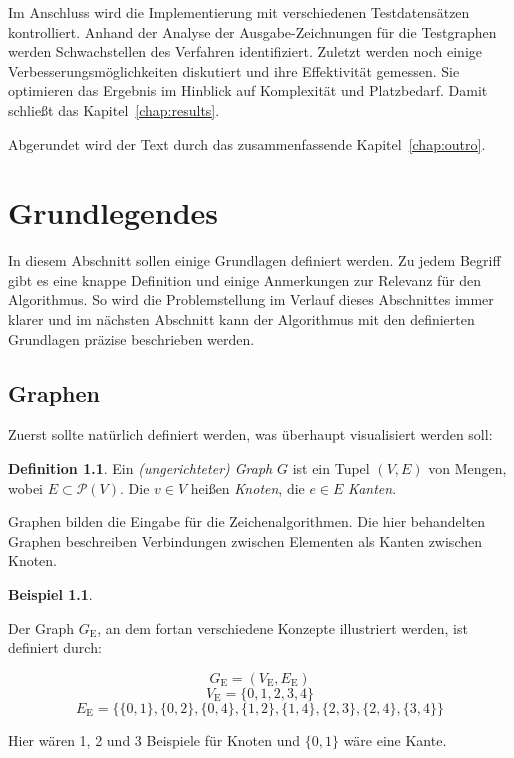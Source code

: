 \documentclass[a4paper]{scrreprt}
\theoremstyle{definition}
\newtheorem{definition}[satz]{Definition}
\newtheorem{example}[satz]{Beispiel}
\begin{document}
Im Anschluss wird die Implementierung mit verschiedenen Testdatensätzen kontrolliert. Anhand der Analyse der Ausgabe-Zeichnungen für die Testgraphen werden Schwachstellen des Verfahren identifiziert. Zuletzt werden noch einige Verbesserungsmöglichkeiten diskutiert und ihre Effektivität gemessen. Sie optimieren das Ergebnis im Hinblick auf Komplexität und Platzbedarf. Damit schließt das Kapitel~\ref{chap:results}.

Abgerundet wird der Text durch das zusammenfassende Kapitel~\ref{chap:outro}.





\chapter{Grundlegendes}
\label{chap:basics}

In diesem Abschnitt sollen einige Grundlagen definiert werden. Zu jedem Begriff gibt es eine knappe Definition und einige Anmerkungen zur Relevanz für den Algorithmus. So wird die Problemstellung im Verlauf dieses Abschnittes immer klarer und im nächsten Abschnitt kann der Algorithmus mit den definierten Grundlagen präzise beschrieben werden.

\section{Graphen}

Zuerst sollte natürlich definiert werden, was überhaupt visualisiert werden soll:

\begin{definition}
  Ein \emph{(ungerichteter) Graph} $G$ ist ein Tupel $(V, E)$ von Mengen, wobei $E \subset \mathcal{P}(V)$.
  Die $v \in V$ heißen \emph{Knoten}, die $e \in E$ \emph{Kanten}.
\end{definition}

Graphen bilden die Eingabe für die Zeichenalgorithmen. Die hier behandelten Graphen beschreiben Verbindungen zwischen Elementen als Kanten zwischen Knoten. 

\begin{example}
  \label{ex:graph}

Der Graph $G_\text{E}$, an dem fortan verschiedene Konzepte illustriert werden, ist definiert durch:

\[G_\text{E} = (V_\text{E}, E_\text{E})\]
\[V_\text{E} = \{0, 1, 2, 3, 4\}\]
\[E_\text{E} = \{\{0, 1\}, \{0, 2\}, \{0, 4\}, \{1, 2\}, \{1, 4\}, \{2, 3\}, \{2, 4\}, \{3, 4\}\}\]

Hier wären 1, 2 und 3 Beispiele für Knoten und $\{0, 1\}$ wäre eine Kante.
\end{example}
\end{document}
